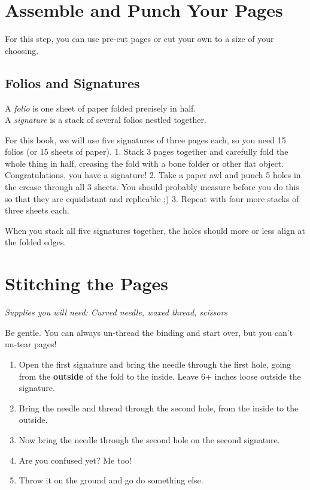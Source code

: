 \documentclass[
  openany]{book}
\providecommand{\tightlist}{%
  \setlength{\itemsep}{0pt}\setlength{\parskip}{0pt}}
\begin{document}
\chapter{Assemble and Punch Your Pages}\label{assemble-and-punch-your-pages}

For this step, you can use pre-cut pages or cut your own to a size of your choosing.

\section{Folios and Signatures}\label{folios-and-signatures}

A \emph{folio} is one sheet of paper folded precisely in half.\\
A \emph{signature} is a stack of several folios nestled together.

For this book, we will use five signatures of three pages each, so you need 15 folios (or 15 sheets of paper).
1. Stack 3 pages together and carefully fold the whole thing in half, creasing the fold with a bone folder or other flat object. Congratulations, you have a signature!
2. Take a paper awl and punch 5 holes in the crease through all 3 sheets. You should probably measure before you do this so that they are equidistant and replicable ;)
3. Repeat with four more stacks of three sheets each.

When you stack all five signatures together, the holes should more or less align at the folded edges.

\chapter{Stitching the Pages}\label{stitching-the-pages}

\emph{Supplies you will need: Curved needle, waxed thread, scissors}

Be gentle. You can always un-thread the binding and start over, but you can't un-tear pages!

\begin{enumerate}
\def\labelenumi{\arabic{enumi}.}
\tightlist
\item
  Open the first signature and bring the needle through the first hole, going from the \textbf{outside} of the fold to the inside. Leave 6+ inches loose outside the signature.
\item
  Bring the needle and thread through the second hole, from the inside to the outside.
\item
  Now bring the needle through the second hole on the second signature.
\item
  Are you confused yet? Me too!
\item
  Throw it on the ground and go do something else.
\end{enumerate}
\end{document}
